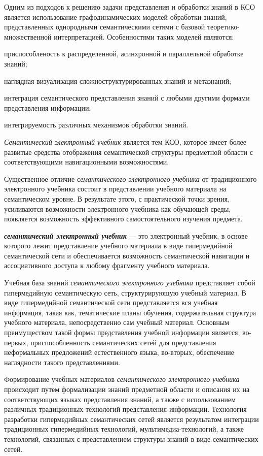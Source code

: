 Одним из подходов к решению задачи представления и обработки знаний в КСО является использование графодинамических моделей обработки знаний, представленных однородными семантическими сетями с базовой теоретико-множественной интерпретацией. Особенностями таких моделей являются:

\begin{textitemize}
	\item приспособленость к распределенной, асинхронной и параллельной обработке знаний;
	\item наглядная визуализация сложноструктурированных знаний и метазнаний;
	\item интеграция семантического представления знаний с любыми другими формами представления информации;
	\item интегрируемость различных механизмов обработки знаний.
\end{textitemize}

\textit{Семантический электронный учебник} является тем КСО, которое имеет более развитые средства отображения семантической структуры предметной области с соответствующими навигационными возможностями.

Существенное отличие с\textit{емантического электронного учебника} от традиционного электронного учебника состоит в представлении учебного материала на семантическом уровне. В результате этого, с практической точки зрения, усиливаются возможности электронного учебника как обучающей среды, появляется возможность эффективного самостоятельного изучения предмета.

\textbf{\textit{семантический электронный учебник}} --- это электронный учебник, в основе которого лежит представление учебного материала в виде гипермедийной семантической сети и обеспечивается возможность семантической навигации и ассоциативного доступа к любому фрагменту учебного материала.

Учебная база знаний \textit{семантического электронного учебника} представляет собой гипермедийную семантическую сеть, структурирующую учебный материал. В виде гипермедийной семантической сети представляется вся учебная информация, такая как, тематические планы обучения, содержательная структура учебного материала, непосредственно сам учебный материал. Основным преимуществом такой формы представления учебной информации является, во-первых, приспособленность семантических сетей для представления неформальных предложений естественного языка, во-вторых, обеспечение наглядности такого представлениями.

Формирование учебных материалов \textit{семантического электронного учебника} происходит путем формализации знаний предметной области и описания их на соответствующих языках представления знаний, а также с использованием различных традиционных технологий представления информации. Технология разработки гипермедийных семантических сетей является результатом интеграции традиционных гипермедийных технологий, мультимедиа-технологий, а также технологий, связанных с представлением структуры знаний в виде семантических сетей.


